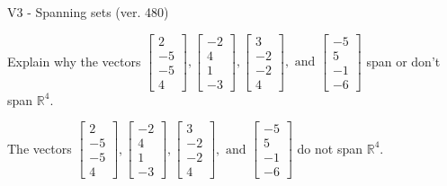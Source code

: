 \begin{exercise}
  \begin{exerciseTitle}V3 - Spanning sets (ver. 480)\end{exerciseTitle}
  \begin{exerciseStatement}
    Explain why the vectors \(\left[\begin{array}{r}
2 \\
-5 \\
-5 \\
4
\end{array}\right] , \left[\begin{array}{r}
-2 \\
4 \\
1 \\
-3
\end{array}\right] , \left[\begin{array}{r}
3 \\
-2 \\
-2 \\
4
\end{array}\right] , \text{ and } \left[\begin{array}{r}
-5 \\
5 \\
-1 \\
-6
\end{array}\right]\) span or don't span \(\mathbb{R}^4\). 
	


  \end{exerciseStatement}
  \begin{exerciseAnswer}
   The vectors \(\left[\begin{array}{r}
2 \\
-5 \\
-5 \\
4
\end{array}\right] , \left[\begin{array}{r}
-2 \\
4 \\
1 \\
-3
\end{array}\right] , \left[\begin{array}{r}
3 \\
-2 \\
-2 \\
4
\end{array}\right] , \text{ and } \left[\begin{array}{r}
-5 \\
5 \\
-1 \\
-6
\end{array}\right]\) 
  	 do not  
	span \(\mathbb{R}^4\).
  


  \end{exerciseAnswer}
\end{exercise}